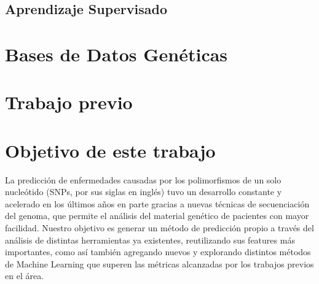 \subsection{Aprendizaje Supervisado}


\section{Bases de Datos Genéticas}

\section{Trabajo previo}

\section{Objetivo de este trabajo}

La predicción de enfermedades causadas por los polimorfismos de un solo nucleótido (SNPs, por sus siglas en inglés) tuvo un desarrollo constante y acelerado en los últimos años en parte gracias a nuevas técnicas de secuenciación del genoma, que permite el análisis del material genético de pacientes con mayor facilidad. Nuestro objetivo es generar un método de predicción propio a través del análisis de distintas herramientas ya existentes, reutilizando sus features más importantes, como así también agregando nuevos y explorando distintos métodos de Machine Learning que superen las métricas alcanzadas por los trabajos previos en el área.


